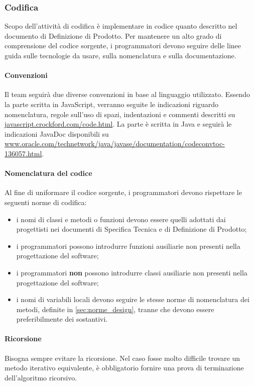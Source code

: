 	\subsubsection{Codifica} \label{sec:cod}
	Scopo dell'attività di codifica è implementare in codice quanto descritto nel documento di Definizione di Prodotto. Per mantenere un alto grado di comprensione del codice sorgente, i programmatori devono seguire delle linee guida sulle tecnologie da usare, sulla nomenclatura e sulla documentazione.

	\paragraph{Convenzioni} \label{sec:conv}
	Il team seguirà due diverse convenzioni in base al linguaggio utilizzato. Essendo la parte  scritta in JavaScript, verranno seguite le indicazioni riguardo nomenclatura, regole sull'uso di spazi, indentazioni e commenti descritti su \url{javascript.crockford.com/code.html}. La parte  è scritta in Java e seguirà le indicazioni JavaDoc disponibili su \url{www.oracle.com/technetwork/java/javase/documentation/codeconvtoc-136057.html}.
	
	\paragraph{Nomenclatura del codice}
	Al fine di uniformare il codice sorgente, i programmatori devono rispettare le seguenti norme di codifica:
	\begin{itemize}
		\item i nomi di classi e metodi o funzioni devono essere quelli adottati dai progettisti nei documenti di Specifica Tecnica e di Definizione di Prodotto;
		\item i programmatori possono introdurre funzioni ausiliarie non presenti nella progettazione del software;
		\item i programmatori \textbf{non} possono introdurre classi ausiliarie non presenti nella progettazione del software;
		\item i nomi di variabili locali devono seguire le stesse norme di nomenclatura dei metodi, definite in \ref{sec:norme_design}, tranne che devono essere preferibilmente dei sostantivi.
	\end{itemize}
	
	\paragraph{Ricorsione}
	Bisogna sempre evitare la ricorsione. Nel caso fosse molto difficile trovare un metodo iterativo equivalente, è obbligatorio fornire una prova di terminazione dell'algoritmo ricorsivo.

